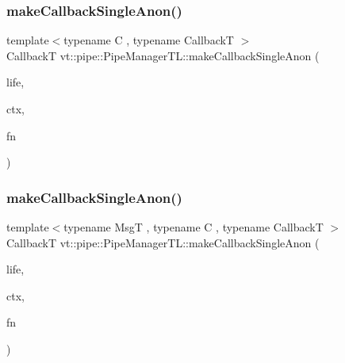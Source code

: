 \mbox{\label{structvt_1_1pipe_1_1_pipe_manager_t_l_ac74f387c8ea9f25e11ca53841cd01779}} 
\subsubsection{\texorpdfstring{make\+Callback\+Single\+Anon()}{makeCallbackSingleAnon()}\hspace{0.1cm}{\footnotesize\ttfamily [4/6]}}
{\footnotesize\ttfamily template$<$typename C , typename CallbackT $>$ \\
CallbackT vt\+::pipe\+::\+Pipe\+Manager\+T\+L\+::make\+Callback\+Single\+Anon (\begin{DoxyParamCaption}\item[{\hyperlink{namespacevt_1_1pipe_acb42b284378c0fdac1d7c6335dc26f58}{Lifetime\+Enum}}]{life,  }\item[{C $\ast$}]{ctx,  }\item[{\hyperlink{structvt_1_1pipe_1_1_pipe_manager_base_ad8463823b6b4cfdb67c119d6d22e3bac}{Func\+Ctx\+Type}$<$ C $>$}]{fn }\end{DoxyParamCaption})}

\mbox{\label{structvt_1_1pipe_1_1_pipe_manager_t_l_aa84891c7d419709ee96473a895d07ae7}} 
\subsubsection{\texorpdfstring{make\+Callback\+Single\+Anon()}{makeCallbackSingleAnon()}\hspace{0.1cm}{\footnotesize\ttfamily [5/6]}}
{\footnotesize\ttfamily template$<$typename MsgT , typename C , typename CallbackT $>$ \\
CallbackT vt\+::pipe\+::\+Pipe\+Manager\+T\+L\+::make\+Callback\+Single\+Anon (\begin{DoxyParamCaption}\item[{\hyperlink{namespacevt_1_1pipe_acb42b284378c0fdac1d7c6335dc26f58}{Lifetime\+Enum}}]{life,  }\item[{C $\ast$}]{ctx,  }\item[{\hyperlink{structvt_1_1pipe_1_1_pipe_manager_base_a73fdf82ece0411b3dc644c99b763f7a9}{Func\+Msg\+Ctx\+Type}$<$ MsgT, C $>$}]{fn }\end{DoxyParamCaption})}

